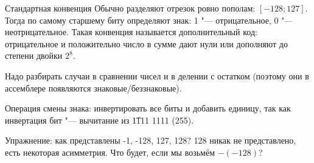 \begin{frame}{Стандартная конвенция}
	Обычно разделяют отрезок ровно пополам: $[-128; 127]$.
	Тогда по самому старшему биту определяют знак: 1 "--- отрицательное, 0 "--- неотрицательное.
	Такая конвенция называется дополнительный код: отрицательное и положительно число в сумме дают нули или
	дополняют до степени двойки $2^8$.

	Надо разбирать случаи в сравнении чисел и в делении с остатком (поэтому они в ассемблере появляются знаковые/беззнаковые).

	Операция смены знака: инвертировать все биты и добавить единицу, так как инвертация бит "--- вычитание из \t{1111 1111} (255).

	Упражнение: как представлены -1, -128, 127, 128?
	128 никак не представлено, есть некоторая асимметрия.
	Что будет, если мы возьмём $-(-128)$?
\end{frame}
